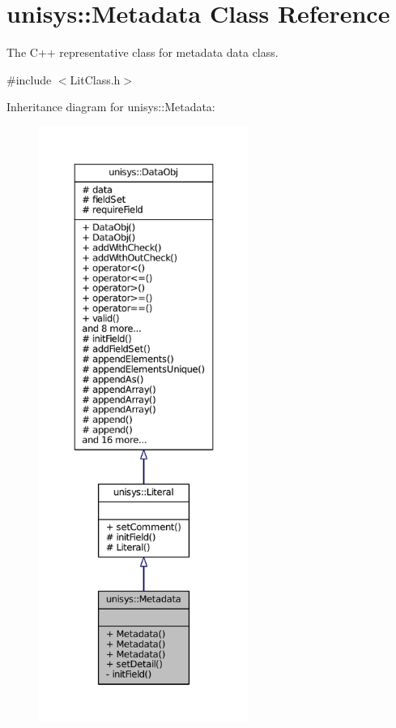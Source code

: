\hypertarget{classunisys_1_1Metadata}{\section{unisys\-:\-:Metadata Class Reference}
\label{classunisys_1_1Metadata}
}


The C++ representative class for metadata data class.  




{\ttfamily \#include $<$Lit\-Class.\-h$>$}



Inheritance diagram for unisys\-:\-:Metadata\-:
\nopagebreak
\begin{figure}[H]
\begin{center}
\leavevmode
\includegraphics[height=550pt]{classunisys_1_1Metadata__inherit__graph}
\end{center}
\end{figure}



